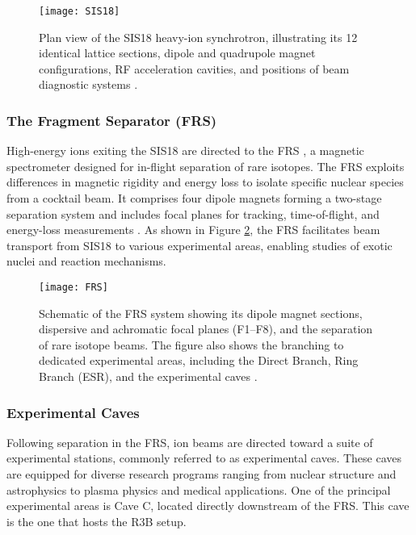 \begin{figure}
	\centering
	\texttt{[image: SIS18]}
	\caption{Plan view of the SIS18 heavy-ion synchrotron, illustrating its 12 identical lattice sections, dipole and quadrupole magnet configurations, RF acceleration cavities, and positions of beam diagnostic systems \cite{gsiSIS18Sections}.}
	\label{fig:SIS18}
\end{figure}

\subsubsection{The Fragment Separator (FRS)}

High-energy ions exiting the SIS18 are directed to the \gls{FRS} \cite{geissel_experiments_2008}, a magnetic spectrometer designed for in-flight separation of rare isotopes. The FRS exploits differences in magnetic rigidity and energy loss to isolate specific nuclear species from a cocktail beam. It comprises four dipole magnets forming a two-stage separation system and includes focal planes for tracking, time-of-flight, and energy-loss measurements . As shown in Figure \ref{fig:FRS}, the FRS facilitates beam transport from SIS18 to various experimental areas, enabling studies of exotic nuclei and reaction mechanisms.


\begin{figure}
	\texttt{[image: FRS]}
	\caption{Schematic of the FRS system showing its dipole magnet sections, dispersive and achromatic focal planes (F1–F8), and the separation of rare isotope beams. The figure also shows the branching to dedicated experimental areas, including the Direct Branch, Ring Branch (ESR), and the experimental caves \cite{gsiWebHomelt}.}
	\label{fig:FRS}
\end{figure}


\subsubsection{Experimental Caves}

Following separation in the \gls{FRS}, ion beams are directed toward a suite of experimental stations, commonly referred to as experimental caves. These caves are equipped for diverse research programs ranging from nuclear structure and astrophysics to plasma physics and medical applications. One of the principal experimental areas is Cave C, located directly downstream of the FRS. This cave is the one that hosts the \gls{R3B} setup.

